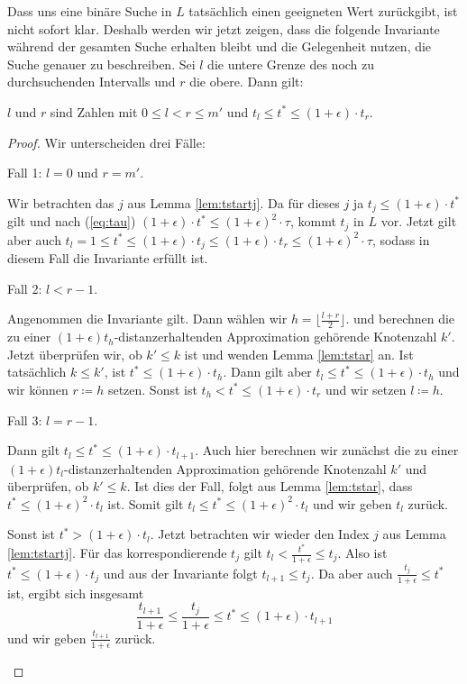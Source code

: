 Dass uns eine binäre Suche in $L$ tatsächlich einen geeigneten Wert zurückgibt, ist nicht sofort klar. Deshalb werden wir jetzt zeigen, dass die folgende Invariante während der gesamten Suche erhalten bleibt und die Gelegenheit nutzen, die Suche genauer zu beschreiben. Sei $l$ die untere Grenze des noch zu durchsuchenden Intervalls und $r$ die obere. Dann gilt:

\begin{invariant}
	\label{lem:invariantmdps}
	$l$ und $r$ sind Zahlen mit $0 \leq l < r \leq m'$ und $t_l \leq t^* \leq (1 + \epsilon)\cdot t_r$.
\end{invariant}
\begin{proof}
	Wir unterscheiden drei Fälle:
	\begin{description}[topsep=0mm, itemsep=0mm]
		\item{Fall 1:} $l = 0$ und $r = m'$.
		
		Wir betrachten das $j$ aus Lemma \ref{lem:tstartj}. 
		Da für dieses $j$ ja $t_j \leq (1 + \epsilon) \cdot t^* $ gilt und nach (\ref{eq:tau}) $(1 + \epsilon) \cdot t^*\leq (1 + \epsilon)^2 \cdot \tau$, kommt $t_j$ in $L$ vor. 
		Jetzt gilt aber auch $t_l = 1 
		\leq t^* 
		\leq (1 + \epsilon) \cdot t_j 
		\leq (1 + \epsilon) \cdot t_r 
		\leq (1 + \epsilon)^2 \cdot \tau$, sodass in diesem Fall die Invariante erfüllt ist.
		
		\item{Fall 2:} 
		$l < r-1$.
		
		Angenommen die Invariante gilt. Dann wählen wir $h = \lfloor \frac{l + r}{2} \rfloor$. 
		und berechnen die zu einer $(1 + \epsilon)t_h$-distanzerhaltenden Approximation gehörende Knotenzahl $k'$. 
		Jetzt überprüfen wir, ob $k' \leq k$ ist und wenden Lemma \ref{lem:tstar} an.
		Ist tatsächlich $k \leq k'$, ist $t^* \leq (1 + \epsilon) \cdot t_h$. 
		Dann gilt aber $t_l \leq t^* \leq  (1 + \epsilon) \cdot t_h$ und wir können $r \coloneqq h$ setzen. 
		Sonst ist $t_h < t^* \leq (1 + \epsilon)\cdot t_r$ und wir setzen $l \coloneqq h$.
		
		\item{Fall 3:} $l = r - 1$.
		
		Dann gilt $t_l \leq t^* \leq (1 + \epsilon)\cdot t_{l+1}$. 
		Auch hier berechnen wir zunächst die zu einer $(1 + \epsilon)t_l$-distanzerhaltenden Approximation gehörende Knotenzahl $k'$ und überprüfen, ob $k' \leq k$.
		Ist dies der Fall, folgt aus Lemma \ref{lem:tstar}, dass $t^* \leq (1 + \epsilon)^2 \cdot t_l$ ist. 
		Somit gilt $t_l \leq t^* \leq (1 + \epsilon)^2 \cdot t_l$ und wir geben $t_l$ zurück.
		
		Sonst ist $t^* > (1 + \epsilon)\cdot t_l$. 
		Jetzt betrachten wir wieder den Index $j$ aus Lemma \ref{lem:tstartj}. 
		Für das korrespondierende $t_j$ gilt $t_l < \frac{t^*}{1 + \epsilon} \leq t_j$. Also ist $t^* \leq (1 + \epsilon) \cdot t_j$ und aus der Invariante folgt $t_{l+1} \leq t_j$.
		Da aber auch $\frac{t_j}{1 + \epsilon} \leq t^*$ ist, ergibt sich insgesamt 
		\[
		\frac{t_{l+1}}{1 + \epsilon} 
		\leq \frac{t_j}{1 + \epsilon} 
		\leq t^* 
		\leq (1 + \epsilon) \cdot t_{l+1}
		\]
		und wir geben $\frac{t_{l+1}}{1 + \epsilon}$ zurück.
	\end{description}
\end{proof}

